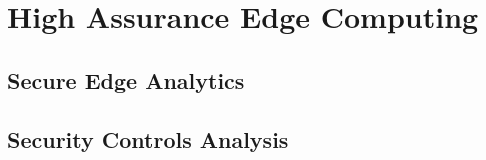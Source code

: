 
\section{High Assurance Edge Computing}\label{sec_contributions}


\subsection{Secure Edge Analytics}\label{subsec_storm}


\subsection{Security Controls Analysis}\label{subsec_rmf}


